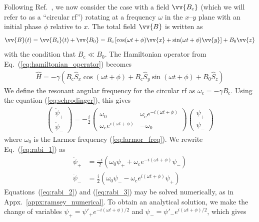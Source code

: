 Following Ref.~\cite{may_thesis}, we now consider the case with a field $\vv{B_\text{c}}$ (which we will refer to as a ``circular \acrshort{rf}'') rotating at a frequency $\omega$ in the $x$--$y$ plane with an initial phase $\phi$ relative to $x$. The total field $\vv{B}$ is written as
%
\begin{gather}
    \vv{B}(t)=\vv{B_\text{c}}(t) + \vv{B_0}=B_\text{c}\left[ \cos (\omega t + \phi) \vv{x} + \sin (\omega t + \phi) \vv{y}\right] + B_0 \vv{z}\label{eq:B0_with_circular_rf}
\end{gather}
%
with the condition that $B_\text{c} \ll B_0$. The Hamiltonian operator from Eq.~(\ref{eq:hamiltonian_operator}) becomes
%
\begin{gather}
    \hat{H} = -\gamma \left( B_\text{c} \hat{S}_x \cos (\omega t + \phi) + B_\text{c} \hat{S}_y  \sin (\omega t + \phi) + B_0\hat{S}_z \right)\label{eq:rabi_hamiltonian}
\end{gather}
%
We define the resonant angular frequency for the circular \acrshort*{rf} as $\omega_\text{c}=-\gamma B_\text{c}$. Using the \schrodinger equation (\ref{eq:schrodinger}), this gives
%
\begin{gather}
    \left(\begin{matrix}
        \dot{\psi}_+\\
        \dot{\psi}_-
    \end{matrix}\right)
    = -\frac{i}{2}
    \left(\begin{matrix}
        \omega_0 & \omega_\text{c}e^{-i(\omega t + \phi)}\\
        \omega_\text{c}e^{i(\omega t + \phi)} & -\omega_0
    \end{matrix} \right)
    \left(\begin{matrix}
        \psi_+\\
        \psi_-
    \end{matrix}\right)\label{eq:rabi_1}
\end{gather}
%
where $\omega_0$ is the Larmor frequency (\ref{eq:larmor_freq}). We rewrite Eq.~(\ref{eq:rabi_1}) as
%
\begin{align}
    \dot{\psi}_+ &=\frac{-i}{2}\left( \omega_0 \psi_+ + \omega_\text{c} e^{-i(\omega t + \phi)} \psi_- \right)\label{eq:rabi_2}\\
    \dot{\psi}_- &=\frac{i}{2}\left( \omega_0 \psi_- - \omega_\text{c} e^{i(\omega t + \phi)} \psi_+ \right)\label{eq:rabi_3}
\end{align}
%
Equations~(\ref{eq:rabi_2}) and (\ref{eq:rabi_3}) may be solved numerically, as in Appx.~\ref{appx:ramsey_numerical}. To obtain an analytical solution, we make the change of variables $\psi_+ = \psi'_+ e^{-i(\omega t + \phi)/2}$ and $\psi_- = \psi'_- e^{i(\omega t + \phi)/2}$, which gives
